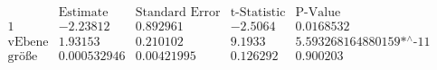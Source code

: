 \[\begin{array}{l|llll}
 \text{} & \text{Estimate} & \text{Standard Error} & \text{t-Statistic} & \text{P-Value} \\
\hline
 1 & -2.23812 & 0.892961 & -2.5064 & 0.0168532 \\
 \text{vEbene} & 1.93153 & 0.210102 & 9.1933 & \text{5.593268164880159$\grave{ }$*${}^{\wedge}$-11} \\
 \text{gr{\" o}{\ss}e} & 0.000532946 & 0.00421995 & 0.126292 & 0.900203 \\
\end{array}\]

